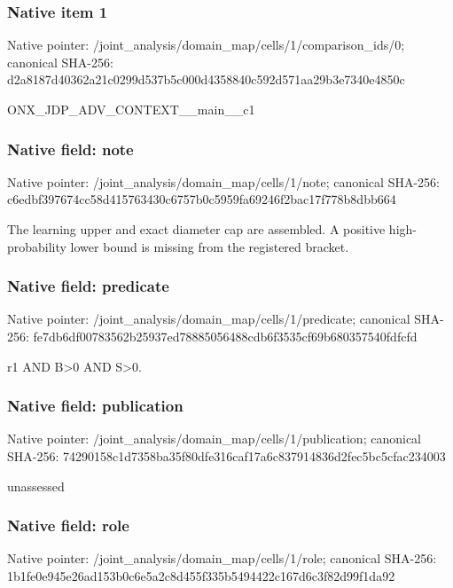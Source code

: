 \documentclass[10pt,a4paper]{article}
\begin{document}
\subsubsection{Native item 1}
Native pointer: /joint\_\allowbreak{}analysis/domain\_\allowbreak{}map/cells/1/comparison\_\allowbreak{}ids/0; canonical SHA-256: d2a8187d40362a21c0299d537b5c000d4358840c592d571aa29b3e7340e4850c

\begingroup\raggedright\sloppy ONX\_\allowbreak{}JDP\_\allowbreak{}ADV\_\allowbreak{}CONTEXT\_\allowbreak{}\_\allowbreak{}main\_\allowbreak{}\_\allowbreak{}c1\par\endgroup

\subsubsection{Native field: note}
Native pointer: /joint\_\allowbreak{}analysis/domain\_\allowbreak{}map/cells/1/note; canonical SHA-256: c6edbf397674cc58d415763430c6757b0c5959fa69246f2bac17f778b8dbb664

\begingroup\raggedright\sloppy The learning upper and exact diameter cap are assembled. A positive high-probability lower bound is missing from the registered bracket.\par\endgroup

\subsubsection{Native field: predicate}
Native pointer: /joint\_\allowbreak{}analysis/domain\_\allowbreak{}map/cells/1/predicate; canonical SHA-256: fe7db6df00783562b25937ed78885056488cdb6f3535cf69b680357540fdfcfd

\begingroup\raggedright\sloppy r1 AND B>0 AND S>0.\par\endgroup

\subsubsection{Native field: publication}
Native pointer: /joint\_\allowbreak{}analysis/domain\_\allowbreak{}map/cells/1/publication; canonical SHA-256: 74290158c1d7358ba35f80dfe316caf17a6c837914836d2fec5bc5cfac234003

\begingroup\raggedright\sloppy unassessed\par\endgroup

\subsubsection{Native field: role}
Native pointer: /joint\_\allowbreak{}analysis/domain\_\allowbreak{}map/cells/1/role; canonical SHA-256: 1b1fe0e945e26ad153b0c6e5a2c8d455f335b5494422c167d6c3f82d99f1da92
\end{document}
